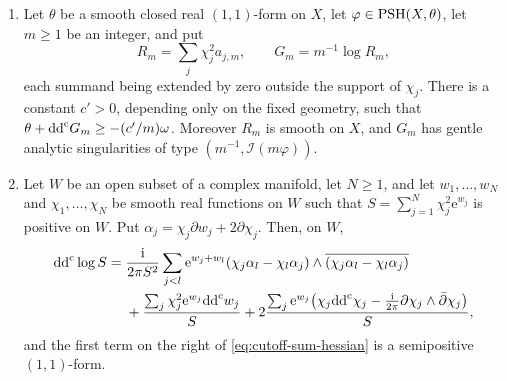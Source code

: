 \begin{lemma}\label{lem:logarithmic-cutoff-sum}
\begin{enumerate}
\item Let $\theta$ be a smooth closed real $(1,1)$-form on $X$, let $\varphi\in\mathrm{PSH}(X,\theta)$, let $m\geq1$ be an integer, and put
\[
 R_m=\sum_j\chi_j^2a_{j,m},\qquad G_m=m^{-1}\log R_m,
\]
each summand being extended by zero outside the support of $\chi_j$. There is a constant $c'>0$, depending only on the fixed geometry, such that $\theta+\mathrm{dd}^{\mathrm{c}} G_m\geq-(c'/m)\omega$. Moreover $R_m$ is smooth on $X$, and $G_m$ has gentle analytic singularities of type $(m^{-1},\mathcal I(m\varphi))$.
\item Let $W$ be an open subset of a complex manifold, let $N\geq1$, and let $w_1,\ldots,w_N$ and $\chi_1,\ldots,\chi_N$ be smooth real functions on $W$ such that $S=\sum_{j=1}^N\chi_j^2\mathrm e^{w_j}$ is positive on $W$. Put $\alpha_j=\chi_j\partial w_j+2\partial\chi_j$. Then, on $W$,
\begin{equation}\label{eq:cutoff-sum-hessian}
\begin{aligned}
 \mathrm{dd}^{\mathrm{c}}\log S={}&\frac{\mathrm i}{2\pi S^2}
 \sum_{j<l}\mathrm e^{w_j+w_l}
 (\chi_j\alpha_l-\chi_l\alpha_j)
       \wedge\overline{(\chi_j\alpha_l-\chi_l\alpha_j)}\\
 &+\frac{\sum_j\chi_j^2\mathrm e^{w_j}\mathrm{dd}^{\mathrm{c}} w_j}{S}
 +2\frac{\sum_j\mathrm e^{w_j}
  \bigl(\chi_j\mathrm{dd}^{\mathrm{c}}\chi_j-\frac{\mathrm i}{2\pi}
                         \partial\chi_j\wedge\bar\partial\chi_j\bigr)}{S},
\end{aligned}
\end{equation}
and the first term on the right of \eqref{eq:cutoff-sum-hessian} is a semipositive $(1,1)$-form.
\end{enumerate}
\end{lemma}
